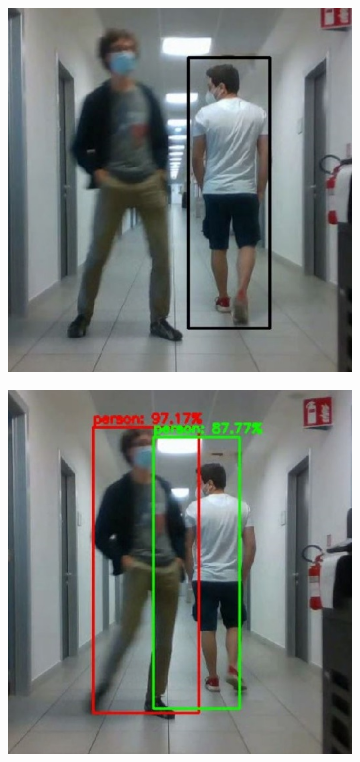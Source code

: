 \begin{figure}[!h]
\begin{subfigure}[!h]{0.325\textwidth}
	\end{subfigure}
	\begin{subfigure}[!h]{0.325\textwidth}
		\includegraphics[width=\linewidth]{images/solution/sequenceTrackOk7}
	\end{subfigure}
	\begin{subfigure}[!h]{0.325\textwidth}
		\includegraphics[width=\linewidth]{images/solution/sequenceTrackOk8}

\end{subfigure}
\end{figure}
